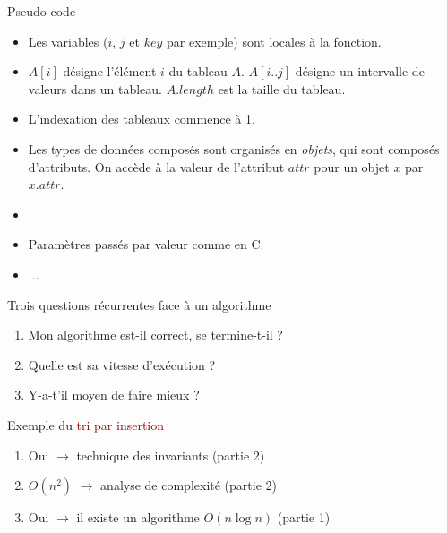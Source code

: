 \begin{frame}{Pseudo-code}

\begin{itemize}
\item Les variables ($i$, $j$ et $key$ par exemple) sont locales à la fonction.
\item $A[i]$ désigne l'élément $i$ du tableau $A$. $A[i..j]$ désigne
  un intervalle de valeurs dans un tableau. $A.length$ est la taille du tableau.
\item L'indexation des tableaux commence à 1.
\item Les types de données composés sont organisés en {\it objets}, qui sont composés d'attributs. On accède à la valeur de l'attribut $attr$ pour un objet $x$ par $x.attr$.
\item 
\item Paramètres passés par valeur comme en C.
\item ...
\end{itemize}
\end{frame}

\begin{frame}{Trois questions récurrentes face à un algorithme}

\begin{enumerate}
\item Mon algorithme est-il correct, se termine-t-il ? %

\bigskip

\item Quelle est sa vitesse d'exécution ? %

\bigskip

\item Y-a-t'il moyen de faire mieux ? %

\end{enumerate}

\bigskip

Exemple du \textcolor{darkred}{tri par insertion}
\begin{enumerate}
\item Oui $\rightarrow$ technique des invariants (partie 2)
\item $O(n^2)$ $\rightarrow$ analyse de complexité (partie 2)
\item Oui $\rightarrow$ il existe un algorithme $O(n\log n)$ (partie 1)
\end{enumerate}

\end{frame}

